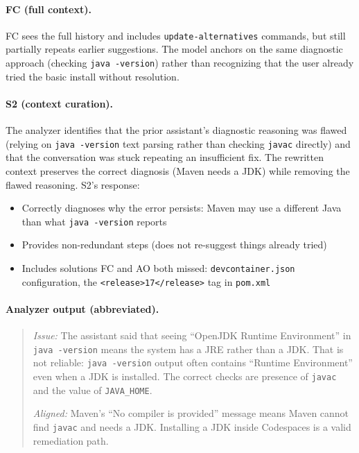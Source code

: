 \documentclass{article}
\begin{document}
\paragraph{FC (full context).} FC sees the full history and includes \texttt{update-alternatives} commands, but still partially repeats earlier suggestions. The model anchors on the same diagnostic approach (checking \texttt{java -version}) rather than recognizing that the user already tried the basic install without resolution.

\paragraph{S2 (context curation).} The analyzer identifies that the prior assistant's diagnostic reasoning was flawed (relying on \texttt{java -version} text parsing rather than checking \texttt{javac} directly) and that the conversation was stuck repeating an insufficient fix. The rewritten context preserves the correct diagnosis (Maven needs a JDK) while removing the flawed reasoning. S2's response:
\begin{itemize}
    \item Correctly diagnoses why the error persists: Maven may use a different Java than what \texttt{java -version} reports
    \item Provides non-redundant steps (does not re-suggest things already tried)
    \item Includes solutions FC and AO both missed: \texttt{devcontainer.json} configuration, the \texttt{\textless release\textgreater 17\textless /release\textgreater} tag in \texttt{pom.xml}
\end{itemize}

\paragraph{Analyzer output (abbreviated).}
\begin{quote}
\emph{Issue:} The assistant said that seeing ``OpenJDK Runtime Environment'' in \texttt{java -version} means the system has a JRE rather than a JDK. That is not reliable: \texttt{java -version} output often contains ``Runtime Environment'' even when a JDK is installed. The correct checks are presence of \texttt{javac} and the value of \texttt{JAVA\_HOME}.

\emph{Aligned:} Maven's ``No compiler is provided'' message means Maven cannot find \texttt{javac} and needs a JDK. Installing a JDK inside Codespaces is a valid remediation path.
\end{quote}
\end{document}
